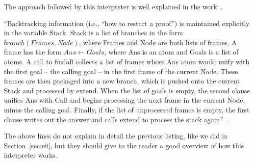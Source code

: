 The approach followed by this interpreter is well explained in the work~\cite{McCartyS94}.

``Backtracking information (i.e., ``how to restart a proof'') is maintained explicitly in the variable Stack.
Stack is a list of branches in the form $branch(Frames,Node)$, where Frames and Node are both
lists of frames. A frame has the form $Ans \leftarrow Goals$, where Ans is an atom and Goals is a list of
atoms. A call to findall collects a list of frames whose Ans atom
would unify with the first goal -- the calling goal -- in the first frame of the current Node. These
frames are then packaged into a new branch, which is pushed onto the current Stack and processed
by extend. When the list of goals is empty, the second clause unifies Ans with Call and
begins processing the next frame in the current Node, minus the calling goal. Finally, if the list
of unprocessed frames is empty, the first clause writes out the answer and calls extend
to process the stack again''~\cite{McCartyS94}.

The above lines do not explain in detail the previous listing, like we did in
Section~\ref{sec:eii}, but they should give to the reader a good overview of how this
interpreter works.
